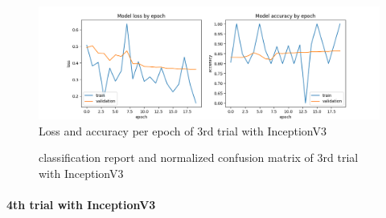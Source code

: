 \documentclass{article}
\begin{document}
\begin{figure}[ht] %
    \centering
    \includegraphics[width=1.0\linewidth]{inceptionv3_06_loss_accuracy.png}
    \caption{Loss and accuracy per epoch of 3rd trial with InceptionV3}
    \label{fig:inceptionv3_06_loss_accuracy}
\end{figure}

\begin{figure}[!ht]
  \centering
  \qquad
  \caption{classification report and normalized confusion matrix of 3rd trial with InceptionV3}
  \label{fig:inceptionv3_06_results}
\end{figure}


\paragraph{4th trial with InceptionV3}\mbox{}\\
\end{document}
